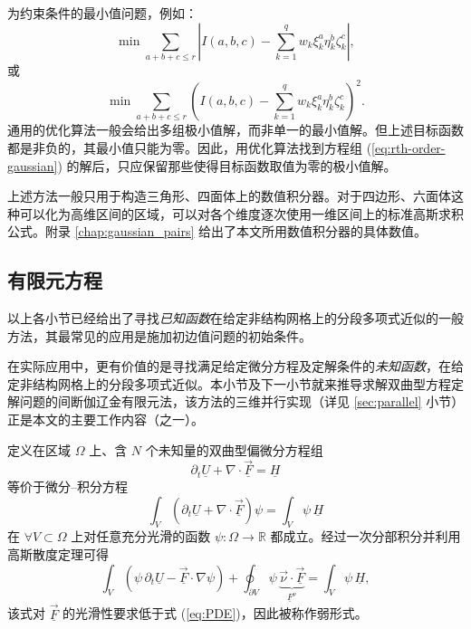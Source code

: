 为约束条件的最小值问题，例如：
\begin{equation}
\min\sum_{a+b+c\le r}\left|I(a,b,c)-\sum_{k=1}^{q}w_{k}\xi_{k}^{a}\eta_{k}^{b}\zeta_{k}^{c}\right|,
\end{equation}
 或
\begin{equation}
\min\sum_{a+b+c\le r}\left(I(a,b,c)-\sum_{k=1}^{q}w_{k}\xi_{k}^{a}\eta_{k}^{b}\zeta_{k}^{c}\right)^{2}.
\end{equation}
通用的优化算法一般会给出多组极小值解，而非单一的最小值解。但上述目标函数都是非负的，其最小值只能为零。因此，用优化算法找到方程组 (\ref{eq:rth-order-gaussian})
的解后，只应保留那些使得目标函数取值为零的极小值解。

上述方法一般只用于构造三角形、四面体上的数值积分器。对于四边形、六面体这种可以化为高维区间的区域，可以对各个维度逐次使用一维区间上的标准高斯求积公式。附录
\ref{chap:gaussian_pairs} 给出了本文所用数值积分器的具体数值。

\subsection{有限元方程}

以上各小节已经给出了寻找\emph{已知函数}在给定非结构网格上的分段多项式近似的一般方法，其最常见的应用是施加初边值问题的初始条件。

在实际应用中，更有价值的是寻找满足给定微分方程及定解条件的\emph{未知函数}，在给定非结构网格上的分段多项式近似。本小节及下一小节就来推导求解双曲型方程定解问题的间断伽辽金有限元法，该方法的三维并行实现（详见
\ref{sec:parallel} 小节）正是本文的主要工作内容（之一）。

定义在区域 $\varOmega$ 上、含 $N$ 个未知量的双曲型偏微分方程组
\begin{equation}
\partial_{t}\underline{U}+\nabla\cdot\underline{\vec{F}}=\underline{H}\label{eq:PDE}
\end{equation}
等价于微分–积分方程
\begin{equation}
\int_{V}\left(\partial_{t}\underline{U}+\nabla\cdot\underline{\vec{F}}\right)\psi=\int_{V}\psi\,\underline{H}
\end{equation}
在 $\forall V\subset\varOmega$ 上对任意充分光滑的函数 $\psi\colon\varOmega\to\mathbb{R}$
都成立。经过一次分部积分并利用高斯散度定理可得
\begin{equation}
\int_{V}\left(\psi\,\partial_{t}\underline{U}-\underline{\vec{F}}\cdot\nabla\psi\right)+\oint_{\partial V}\psi\,\underbrace{\vec{\nu}\cdot\underline{\vec{F}}}_{\underline{F}^{\nu}}=\int_{V}\psi\,\underline{H},\label{eq:weak-form}
\end{equation}
该式对 $\underline{\vec{F}}$ 的光滑性要求低于式 (\ref{eq:PDE})，因此被称作弱形式。

